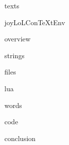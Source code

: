 
\usemodule[t-diSimp]

\startDiSimpComponent texts

\diSimpEnvironment joyLoLConTeXtEnv

\startJoyLoLCoAlg[title=Texts][texts]

\diSimpComponent overview

\diSimpComponent strings

\diSimpComponent files

\diSimpComponent lua

\diSimpComponent words

\diSimpComponent code

\diSimpComponent conclusion

\stopJoyLoLCoAlg

\stopDiSimpComponent
